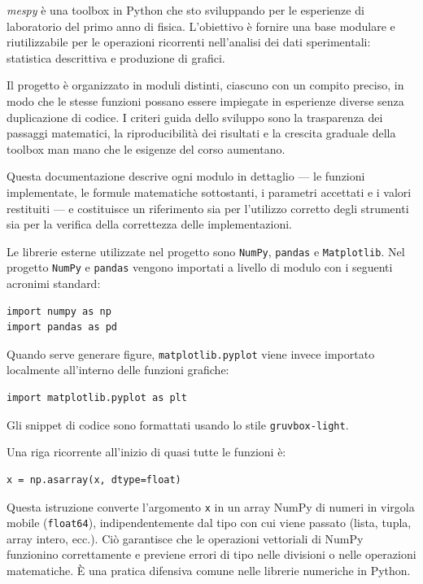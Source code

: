 
\textit{mespy} è una toolbox in Python che sto sviluppando per le esperienze di laboratorio del primo anno di fisica. L'obiettivo è fornire una base modulare e riutilizzabile per le operazioni ricorrenti nell'analisi dei dati sperimentali: statistica descrittiva e produzione di grafici.

Il progetto è organizzato in moduli distinti, ciascuno con un compito preciso, in modo che le stesse funzioni possano essere impiegate in esperienze diverse senza duplicazione di codice. I criteri guida dello sviluppo sono la trasparenza dei passaggi matematici, la riproducibilità dei risultati e la crescita graduale della toolbox man mano che le esigenze del corso aumentano.

Questa documentazione descrive ogni modulo in dettaglio — le funzioni implementate, le formule matematiche sottostanti, i parametri accettati e i valori restituiti — e costituisce un riferimento sia per l'utilizzo corretto degli strumenti sia per la verifica della correttezza delle implementazioni.


Le librerie esterne utilizzate nel progetto sono \texttt{NumPy}, \texttt{pandas} e \texttt{Matplotlib}. Nel progetto \texttt{NumPy} e \texttt{pandas} vengono importati a livello di modulo con i seguenti acronimi standard:
\begin{verbatim}
import numpy as np
import pandas as pd
\end{verbatim}

Quando serve generare figure, \texttt{matplotlib.pyplot} viene invece importato localmente all'interno delle funzioni grafiche:
\begin{verbatim}
import matplotlib.pyplot as plt
\end{verbatim}

Gli snippet di codice sono formattati usando lo stile \texttt{gruvbox-light}.

Una riga ricorrente all'inizio di quasi tutte le funzioni è:
\begin{verbatim}
x = np.asarray(x, dtype=float)
\end{verbatim}
Questa istruzione converte l'argomento \texttt{x} in un array NumPy di numeri in virgola mobile (\texttt{float64}), indipendentemente dal tipo con cui viene passato (lista, tupla, array intero, ecc.). Ciò garantisce che le operazioni vettoriali di NumPy funzionino correttamente e previene errori di tipo nelle divisioni o nelle operazioni matematiche. È una pratica difensiva comune nelle librerie numeriche in Python.
\hfill
